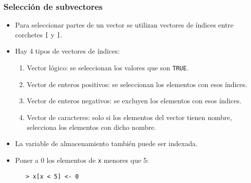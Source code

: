 \documentclass{beamer}
\begin{document}

\begin{frame}[fragile]
\frametitle{Selección de subvectores}
\begin{itemize}
\item Para seleccionar partes de un vector se utilizan vectores de índices entre corchetes \texttt{[} y \texttt{]}.
\item Hay 4 tipos de vectores de índices:
\begin{enumerate}
\item Vector lógico: se seleccionan los valores que son \texttt{TRUE}.
\item Vector de enteros positivos: se seleccionan los elementos con esos índices.
\item Vector de enteros negativos: se excluyen los elementos con esos índices.
\item Vector de caracteres: solo si los elementos del vector tienen nombre, selecciona los elementos con dicho nombre.
\end{enumerate}
\item La variable de almacenamiento también puede ser indexada.
\item Poner a 0 los elementos de \texttt{x} menores que 5:
\begin{verbatim}
   > x[x < 5] <- 0
\end{verbatim}
\end{itemize}
\end{frame}
\end{document}
